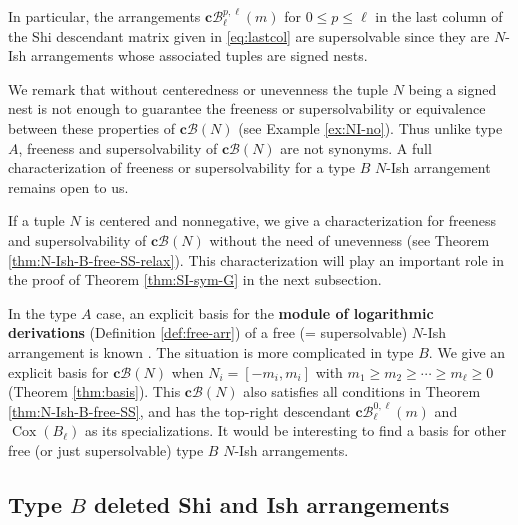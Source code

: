 \documentclass[11pt]{article}
\theoremstyle{definition}
\numberwithin{equation}{section}
\DeclareMathOperator{\Cox}{Cox}
\newcommand{\B}{\mathcal{B}}
\newcommand{\tbf}{\textbf}
\begin{document}
 In particular, the arrangements $\tbf{c}\B^{p,\ell}_\ell(m)$ for $0 \le p \le \ell$ in the last column of the Shi descendant matrix given in \eqref{eq:lastcol} are  supersolvable since they are $N$-Ish arrangements whose associated tuples are signed nests. 
 
 We remark that without centeredness or unevenness the tuple $N$ being a signed nest is not enough to guarantee the freeness or supersolvability or equivalence between these properties of $\tbf{c}\B(N)$ (see Example \ref{ex:NI-no}). 
 Thus unlike type $A$, freeness and supersolvability of $\tbf{c}\B(N)$ are not synonyms. 
 A full characterization of freeness or supersolvability for a type $B$ $N$-Ish arrangement remains open to us.
 
If a tuple $N$ is centered and nonnegative, we give a characterization for freeness and supersolvability of $\tbf{c}\B(N)$ without the need of unevenness (see Theorem \ref{thm:N-Ish-B-free-SS-relax}). 
This characterization will play an important role in the proof of Theorem \ref{thm:SI-sym-G} in the next subsection.

 In the type $A$ case, an explicit basis for the \textbf{module of logarithmic derivations} (Definition \ref{def:free-arr}) of a free (= supersolvable) $N$-Ish arrangement is known \cite[Theorem 1.4]{AST17}. 
 The situation is more complicated in type $B$.
 We give an explicit basis for $\tbf{c}\B(N)$ when $N_i=[-m_i,m_i]$ with $ m_1 \ge m_2 \ge \cdots \ge m_\ell \ge 0$ (Theorem \ref{thm:basis}). 
This $\tbf{c}\B(N)$ also satisfies all conditions in Theorem \ref{thm:N-Ish-B-free-SS}, and has the top-right descendant $ \tbf{c}\B^{0,\ell}_\ell(m)$ and $\Cox(B_\ell)$ as its specializations. 
It would be interesting to find a basis for other free (or just supersolvable) type $B$ $N$-Ish arrangements.

\subsection{Type \texorpdfstring{$B$}{B} deleted Shi and Ish arrangements}
\label{subsec:Bdelete}
\end{document}
